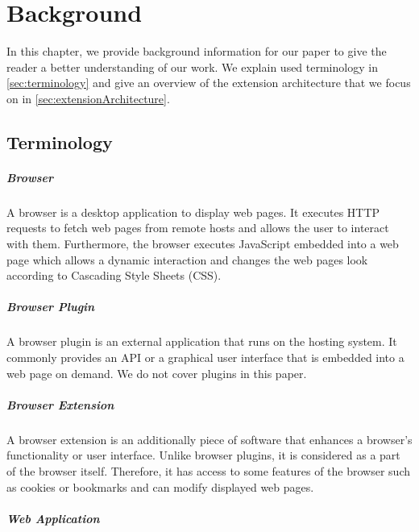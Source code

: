 
\chapter{Background}
\label{chp:background}

	In this chapter, we provide background information for our paper to give the reader a better understanding of our work. We explain used terminology in \autoref{sec:terminology} and give an overview of the extension architecture that we focus on in \autoref{sec:extensionArchitecture}.

\section{Terminology}
\label{sec:terminology}
	
\paragraph{Browser}

	A browser is a desktop application to display web pages. It executes HTTP requests to fetch web pages from remote hosts and allows the user to interact with them. Furthermore, the browser executes JavaScript embedded into a web page which allows a dynamic interaction and changes the web pages look according to Cascading Style Sheets (CSS).
	
\paragraph{Browser Plugin}
	
	A browser plugin is an external application that runs on the hosting system. It commonly provides an API or a graphical user interface that is embedded into a web page on demand. We do not cover plugins in this paper.
	
\paragraph{Browser Extension}
	
	A browser extension is an additionally piece of software that enhances a browser's functionality or user interface. Unlike browser plugins, it is considered as a part of the browser itself. Therefore, it has access to some features of the browser such as cookies or bookmarks and can modify displayed web pages. 

\paragraph{Web Application}

